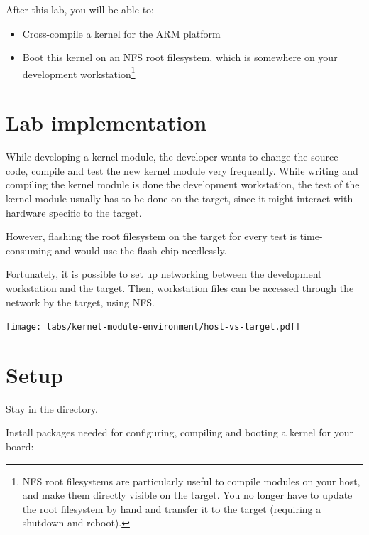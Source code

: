 
After this lab, you will be able to:
\begin{itemize}

\item Cross-compile a kernel for the ARM platform

\item Boot this kernel on an NFS root filesystem, which is somewhere
on your development workstation\footnote{NFS root filesystems are
particularly useful to compile modules on your host, and make them
directly visible on the target. You no longer have to update the root
filesystem by hand and transfer it to the target (requiring a shutdown
and reboot).}

\end{itemize}

\section{Lab implementation}

While developing a kernel module, the developer wants to change the
source code, compile and test the new kernel module very
frequently. While writing and compiling the kernel module is done the
development workstation, the test of the kernel module usually has to
be done on the target, since it might interact with hardware specific
to the target.

However, flashing the root filesystem on the target for every test is
time-consuming and would use the flash chip needlessly.

Fortunately, it is possible to set up networking between the
development workstation and the target. Then, workstation files can be
accessed through the network by the target, using NFS.

\begin{center}
\texttt{[image: labs/kernel-module-environment/host-vs-target.pdf]}
\end{center}

\section{Setup}

Stay in the  directory.

Install packages needed for configuring, compiling and booting
a kernel for your board:

